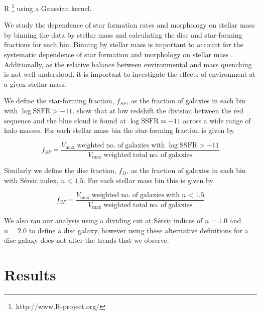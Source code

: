 \textsc{R} \citep{r2013}\footnote{http://www.R-project.org/} using a
Gaussian kernel.
\par
We study the dependence of star formation rates and morphology on
stellar mass by binning the data by stellar mass and calculating the
disc and star-forming fractions for each bin.  Binning by stellar mass
is important to account for the systematic dependence of star
formation and morphology on stellar mass
\citep[e.g.][]{brinchmann2004, whitaker2012}.  Additionally, as the
relative balance between environmental and mass quenching is not well
understood, it is important to investigate the effects of environment
at a given stellar mass.
\par
We define the star-forming fraction, $f_{SF}$, as the fraction of
galaxies in each bin with $\log \mathrm{SSFR} > -11$.
\citet{wetzel2012} show that at low redshift the division between the
red sequence and the blue cloud is found at $\log \mathrm{SSFR} \simeq
-11$ across a wide range of halo masses.  For each stellar mass bin
the star-forming fraction is given by

\begin{equation}
  f_{SF} =
  \frac{V_\mathrm{max}\;\mathrm{weighted}\;\mathrm{no.}\;\mathrm{of}\;\mathrm{galaxies}\;\mathrm{with}\;\log
    \mathrm{SSFR} >
    -11}{V_\mathrm{max}\;\mathrm{weighted}\;\mathrm{total}\;\mathrm{no.}\;\mathrm{of}\;\mathrm{galaxies}}
\end{equation}

\noindent
Similarly we define the disc fraction, $f_D$, as the fraction of
galaxies in each bin with S{\'e}rsic index, $n < 1.5$.  For each
stellar mass bin this is given by

\begin{equation}
  f_{SF} =
  \frac{V_\mathrm{max}\;\mathrm{weighted}\;\mathrm{no.}\;\mathrm{of}\;\mathrm{galaxies}\;\mathrm{with}\;
    n < 1.5}{V_\mathrm{max}\;\mathrm{weighted}\;\mathrm{total}\;\mathrm{no.}\;\mathrm{of}\;\mathrm{galaxies}}
\end{equation}

\noindent
We also ran our analysis using a dividing cut at S{\'e}rsic indices of
$n=1.0$ and $n=2.0$ to define a disc galaxy, however using these
alternative definitions for a disc galaxy does not alter the trends
that we observe.

\section{Results}
\label{sec:results_x}

